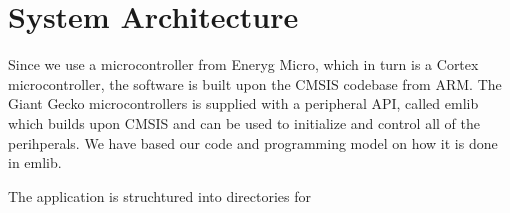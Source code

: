 \section{System Architecture}

Since we use a microcontroller from Eneryg Micro, which in turn is a
Cortex microcontroller, the software is built upon the CMSIS codebase
from ARM.
The Giant Gecko microcontrollers is supplied with a peripheral API,
called emlib which builds upon CMSIS and can be used to initialize and 
control all of the perihperals.
We have based our code and programming model on how it is done in emlib.

The application is struchtured into directories for 